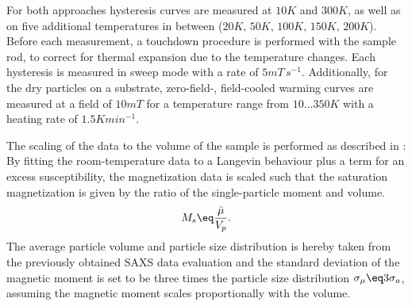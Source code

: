 \documentclass[\main/dresen_thesis.tex]{subfiles}
\begin{document}
    For both approaches hysteresis curves are measured at $10 \unit{K}$ and $300 \unit{K}$, as well as on five additional temperatures in between ($20\unit{K},\,50\unit{K},\,100\unit{K},\,150\unit{K},\,200\unit{K}$).
    Before each measurement, a touchdown procedure is performed with the sample rod, to correct for thermal expansion due to the temperature changes.
    Each hysteresis is measured in sweep mode with a rate of $5 \unit{mT \, s^{-1}}$.
    Additionally, for the dry particles on a substrate, zero-field-, field-cooled warming curves are measured at a field of $10 \unit{mT}$ for a temperature range from $10 \ldots 350 \unit{K}$ with a heating rate of $1.5 \unit{K min^{-1}}$.

    The scaling of the data to the volume of the sample is performed as described in :
    By fitting the room-temperature data to a Langevin behaviour plus a term for an excess susceptibility, the magnetization data is scaled such that the saturation magnetization is given by the ratio of the single-particle moment and volume.
    \begin{align}
      M_s \eq \frac{\bar{\mu}}{V_p}.
    \end{align}
    The average particle volume and particle size distribution is hereby taken from the previously obtained SAXS data evaluation and the standard deviation of the magnetic moment is set to be three times the particle size distribution $\sigma_\mu \eq 3 \sigma_a$, assuming the magnetic moment scales proportionally with the volume.

\end{document}
